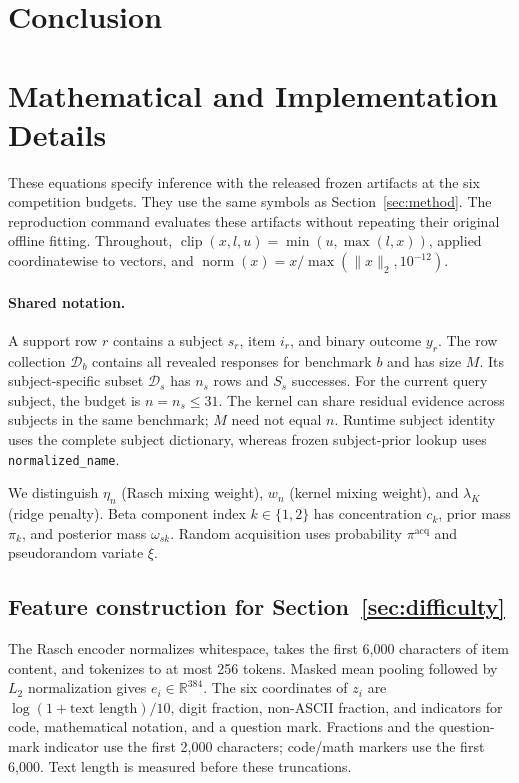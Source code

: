 \documentclass{article}
\begin{document}
\section{Conclusion}



\clearpage
\appendix

\section{Mathematical and Implementation Details}\label{app:implementation}

These equations specify inference with the released frozen artifacts at the six competition budgets. They use the same symbols as Section~\ref{sec:method}. The reproduction command evaluates these artifacts without repeating their original offline fitting. Throughout, $\operatorname{clip}(x,l,u)=\min(u,\max(l,x))$, applied coordinatewise to vectors, and $\operatorname{norm}(x)=x/\max(\|x\|_2,10^{-12})$.

\paragraph{Shared notation.}
A support row $r$ contains a subject $s_r$, item $i_r$, and binary outcome $y_r$. The row collection $\mathcal D_b$ contains all revealed responses for benchmark $b$ and has size $M$. Its subject-specific subset $\mathcal D_s$ has $n_s$ rows and $S_s$ successes. For the current query subject, the budget is $n=n_s\le31$. The kernel can share residual evidence across subjects in the same benchmark; $M$ need not equal $n$. Runtime subject identity uses the complete subject dictionary, whereas frozen subject-prior lookup uses \texttt{normalized\_name}.

We distinguish $\eta_n$ (Rasch mixing weight), $w_n$ (kernel mixing weight), and $\lambda_K$ (ridge penalty). Beta component index $k\in\{1,2\}$ has concentration $c_k$, prior mass $\pi_k$, and posterior mass $\omega_{sk}$. Random acquisition uses probability $\pi^{\mathrm{acq}}$ and pseudorandom variate $\xi$.

\subsection{Feature construction for Section~\ref{sec:difficulty}}\label{app:features}

The Rasch encoder normalizes whitespace, takes the first 6,000 characters of item content, and tokenizes to at most 256 tokens. Masked mean pooling followed by $L_2$ normalization gives $e_i\in\mathbb R^{384}$. The six coordinates of $z_i$ are $\log(1+\text{text length})/10$, digit fraction, non-ASCII fraction, and indicators for code, mathematical notation, and a question mark. Fractions and the question-mark indicator use the first 2,000 characters; code/math markers use the first 6,000. Text length is measured before these truncations.
\end{document}
